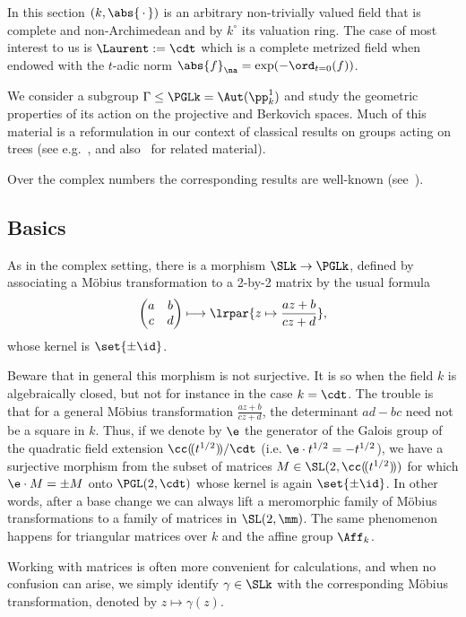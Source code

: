 In this section $(k, \abs{{\,\cdot\,}})$ is an arbitrary non-trivially valued field that is complete and non-Archimedean and by $k^\circ$ its valuation ring. The case of most interest to us is $\Laurent:=\cdt$ which is a complete metrized field when endowed with the $t$-adic norm $\abs{f}_\na = \exp(-\ord_{t=0}(f))$.

We consider a subgroup $\Gamma\leq \PGLk = \Aut(\pp^1_k)$ and study the geometric properties of its action on the projective and Berkovich spaces. Much of this material is a reformulation in our context of classical results on groups acting on trees (see e.g.~\cite{culler-morgan, kapovich,otal}, and also~\cite{yang-wang} for related material).

Over the complex numbers the corresponding results are well-known (see~\cite{beardon}).

\subsection{Basics}

As in the complex setting, there is a morphism $\SLk\to\PGLk$, defined by associating a M\"obius transformation to a 2-by-2 matrix by the usual formula
\[
\left(
\begin{matrix} a & b \\ c & d
\end{matrix}\right) \longmapsto \lrpar{z\mapsto \frac{az+b}{cz+d}},
\]
whose kernel is $\set{\pm \id}$.

Beware that in general this morphism is not surjective. It is so when the field $k$ is algebraically closed, but not for instance in the case $k = \cdt$. The trouble is that for a general M\"obius transformation $\frac{az+b}{cz+d}$, the determinant $ad-bc$ need not be a square in $k$. Thus, if we denote by $\e$ the generator of the Galois group of the quadratic field extension $\cc(\!(t^{1/2})\!) / \cdt$ (i.e. $\e \cdot t^{1/2} = - t^{1/2}$), we have a surjective morphism from the subset of matrices $M \in \SL(2, \cc(\!(t^{1/2})\!))$ for which $ \e \cdot M = \pm M$ onto $\PGL(2,\cdt)$ whose kernel is again $\set{\pm \id}$. In other words, after a base change we can always lift a meromorphic family of M\"obius transformations to a family of matrices in $\SL(2, \mm)$. The same phenomenon happens for triangular matrices over $k$ and the affine group $\Aff_k$.

Working with matrices is often more convenient for calculations, and when no confusion can arise, we simply identify $\gamma\in \SLk$ with the corresponding M\"obius transformation, denoted by $z\mapsto \gamma(z)$.

